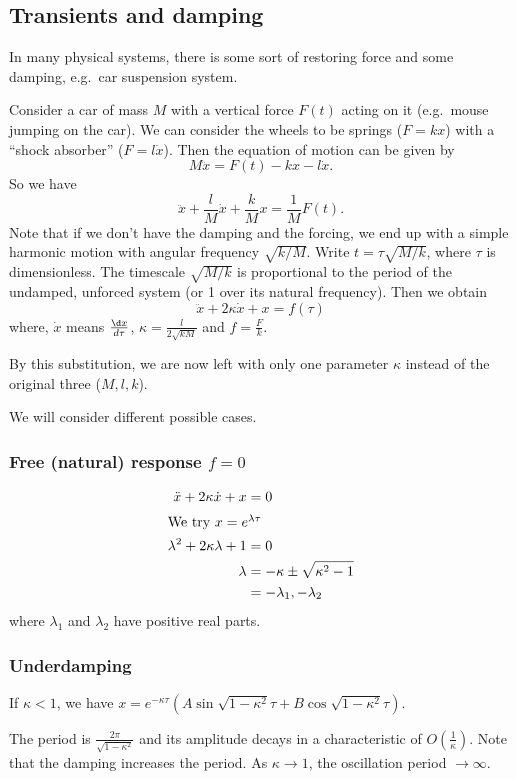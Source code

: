 \documentclass[a4paper]{article}
\begin{document}
\subsection{Transients and damping}
In many physical systems, there is some sort of restoring force and some damping, e.g.\ car suspension system.

Consider a car of mass $M$ with a vertical force $F(t)$ acting on it (e.g.\ mouse jumping on the car). We can consider the wheels to be springs ($F = kx$) with a ``shock absorber'' ($F = l\dot x$). Then the equation of motion can be given by
\[
  M\ddot x = F(t) - kx - l\dot x.
\]
So we have
\[
  \ddot x + \frac{l}{M}\dot x + \frac{k}{M}x = \frac{1}{M}F(t).
\]
Note that if we don't have the damping and the forcing, we end up with a simple harmonic motion with angular frequency $\sqrt{k/M}$. Write $t = \tau \sqrt{M/k}$, where $\tau$ is dimensionless. The timescale $\sqrt{M/k}$ is proportional to the period of the undamped, unforced system (or 1 over its natural frequency). Then we obtain
\[
  \ddot x + 2\kappa\dot x + x = f(\tau)
\]
where, $\dot x$ means $\frac{\d x}{d\tau}$, $\kappa = \frac{l}{2\sqrt{kM}}$ and $f = \frac{F}{k}$.

By this substitution, we are now left with only one parameter $\kappa$ instead of the original three ($M, l, k$).

We will consider different possible cases.

\subsubsection*{Free (natural) response \texorpdfstring{$f = 0$}{f = 0}}
\begin{align*}
  \ddot x + 2\kappa \dot x + x &= 0\\
  \intertext{We try $x = e^{\lambda \tau}$}
  \lambda^2 + 2\kappa\lambda + 1 &= 0\\
  \lambda &= -\kappa \pm \sqrt{\kappa^2 - 1}\\
  &= -\lambda_1, -\lambda_2
\end{align*}
where $\lambda_1$ and $\lambda_2$ have positive real parts.

\subsubsection*{Underdamping}
If $\kappa < 1$, we have $x = e^{-\kappa\tau}(A\sin \sqrt{1 - \kappa^2}\tau +B\cos \sqrt{1 - \kappa^2}\tau)$.

The period is $\frac{2\pi}{\sqrt{1 - \kappa^2}}$ and its amplitude decays in a characteristic of $O(\frac{1}{\kappa})$. Note that the damping increases the period. As $\kappa \to 1$, the oscillation period $\to \infty$.
\begin{center}
\end{center}
\end{document}
